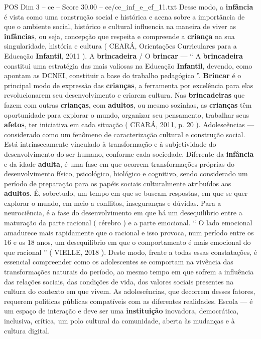 \begin{textsample}{POS Dim 3 – ce – Score 30.00 – ce/ce\_inf\_e\_ef\_11.txt}
Desse modo, a \textbf{infância} é vista como uma construção social e histórica e acena sobre a importância de que o ambiente social, histórico e cultural influencia na maneira de viver as \textbf{infâncias}, ou seja, concepção que respeita e compreende a \textbf{criança} na sua singularidade, história e cultura ( CEARÁ, Orientações Curriculares para a Educação \textbf{Infantil}, 2011 ).
A \textbf{brincadeira} / O \textbf{brincar} — “ A \textbf{brincadeira} constitui uma estratégia das mais valiosas na Educação \textbf{Infantil}, devendo, como apontam as DCNEI, constituir a base do trabalho pedagógico ”. \textbf{Brincar} é o principal modo de expressão das \textbf{crianças}, a ferramenta por excelência para elas revolucionarem seu desenvolvimento e criarem cultura.
Nas \textbf{brincadeiras} que fazem com outras \textbf{crianças}, com \textbf{adultos}, ou mesmo sozinhas, as \textbf{crianças} têm oportunidade para explorar o mundo, organizar seu pensamento, trabalhar seus \textbf{afetos}, ter iniciativa em cada situação ( CEARÁ, 2011, p. 20 ).
Adolescências — considerado como um fenômeno de caracterização cultural e construção social.
Está intrinsecamente vinculado à transformação e à subjetividade do desenvolvimento do ser humano, conforme cada sociedade.
Diferente da \textbf{infância} e da idade \textbf{adulta}, é uma fase em que ocorrem transformações próprias do desenvolvimento físico, psicológico, biológico e cognitivo, sendo considerado um período de preparação para os papéis sociais culturalmente atribuídos aos \textbf{adultos}.
É, sobretudo, um tempo em que se buscam respostas, em que se quer explorar o mundo, em meio a conflitos, inseguranças e dúvidas.
Para a neurociência, é a fase do desenvolvimento em que há um desequilíbrio entre a maturação da parte racional ( cérebro ) e a parte emocional. “ O lado emocional amadurece mais rapidamente que o racional e isso provoca, num período entre os 16 e os 18 anos, um desequilíbrio em que o comportamento é mais emocional do que racional ” ( VIELLE, 2018 ).
Deste modo, frente a todas essas constatações, é essencial compreender como os adolescentes se comportam na vivência das transformações naturais do período, ao mesmo tempo em que sofrem a influência das relações sociais, das condições de vida, dos valores sociais presentes na cultura do contexto em que vivem.
As adolescências, que decorrem desses fatores, requerem políticas públicas compatíveis com as diferentes realidades.
Escola — é um espaço de interação e deve ser uma \textbf{instituição} inovadora, democrática, inclusiva, crítica, um polo cultural da comunidade, aberta às mudanças e à cultura digital.

\end{textsample}
